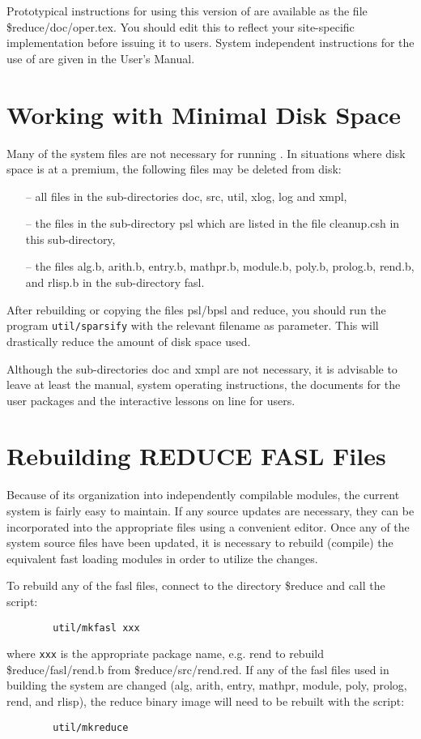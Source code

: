 Prototypical instructions for using this version of {\REDUCE}
are available as the file \$reduce/doc/oper.tex. You should edit this to
reflect your site-specific implementation before issuing it to users.
System independent instructions for the use of {\REDUCE} are given in the
{\REDUCE} User's Manual.

\section{Working with Minimal Disk Space}
Many of the {\REDUCE} system files are not necessary for running
{\REDUCE}.  In situations where disk space is at a premium, the following
files may be deleted from disk:
\begin{enumerate}
\item[--] all files in the sub-directories doc, src, util, xlog, log and xmpl,
\item[--] the files in the sub-directory psl which are listed in the file
cleanup.csh in this sub-directory,
\item[--] the files alg.b, arith.b, entry.b, mathpr.b, module.b, poly.b,
prolog.b, rend.b, and rlisp.b in the sub-directory fasl.
\end{enumerate}

After rebuilding or copying the files psl/bpsl and reduce, you should run
the program {\tt util/sparsify} with the relevant filename as parameter.
This will drastically reduce the amount of disk space used.

Although the sub-directories doc and xmpl are not necessary, it is
advisable to leave at least the {\REDUCE} manual, system operating
instructions, the documents for the user packages and the {\REDUCE}
interactive lessons on line for users.

\section{Rebuilding REDUCE FASL Files}
Because of its organization into independently compilable modules, the
current {\REDUCE} system is fairly easy to maintain.  If any source
updates are necessary, they can be incorporated into the appropriate files
using a convenient editor.  Once any of the system source files have been
updated, it is necessary to rebuild (compile) the equivalent fast loading
modules in order to utilize the changes.

To rebuild any of the {\REDUCE} fasl files, connect to the directory
\$reduce and call the script:
\begin{verbatim}
        util/mkfasl xxx
\end{verbatim}
where {\tt xxx} is the appropriate package name, e.g. rend to rebuild
\$reduce/fasl/rend.b from \$reduce/src/rend.red.  If any of the fasl files
used in building the {\REDUCE} system are changed (alg, arith, entry,
mathpr, module, poly, prolog, rend, and rlisp), the reduce binary image will
need to be rebuilt with the script:
\begin{verbatim}
        util/mkreduce
\end{verbatim}

